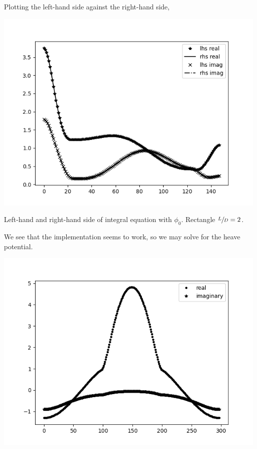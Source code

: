 Plotting the left-hand side against the right-hand side,
\begin{Figure}
    \centering
    \captionsetup{type = figure}
    \includegraphics[width = \textwidth]{phi0_L2_D1_kD1point2.png}
    \caption{Left-hand and right-hand side of integral equation with $\phi_0$. Rectangle $\sfrac{L}{D} = 2$.}
\end{Figure}
We see that the implementation seems to work, so we may solve for the heave potential.
\begin{Figure}
    \centering
    \captionsetup{type = figure}
    \includegraphics[width = \textwidth]{heave_L10_D1_kD1p2.png}
\end{Figure}